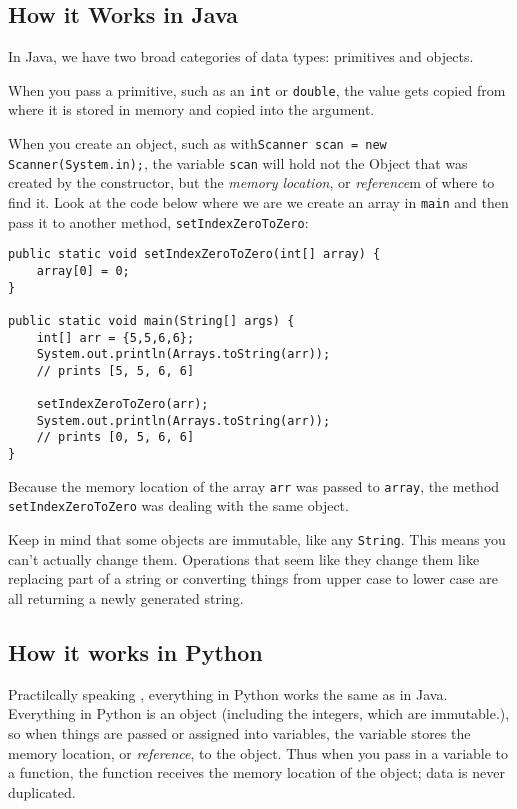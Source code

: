 \subsection{How it Works in Java}
In Java, we have two broad categories of data types: primitives and objects.

When you pass a primitive, such as an \texttt{int} or \texttt{double}, the value gets copied from where it is stored in memory and copied into the argument.

When you create an object, such as with\texttt{Scanner scan =  new Scanner(System.in);}, 
the variable \texttt{scan} will hold not the Object that was created by the constructor, but the \textit{memory location}, or  \textit{reference}m of where to find it.
Look at the code below where we are we create an array in \texttt{main} and then pass it to another method, \texttt{setIndexZeroToZero}:

\begin{verbatim}
public static void setIndexZeroToZero(int[] array) {
	array[0] = 0;
}

public static void main(String[] args) {
	int[] arr = {5,5,6,6};
	System.out.println(Arrays.toString(arr));
	// prints [5, 5, 6, 6]
	
	setIndexZeroToZero(arr);
	System.out.println(Arrays.toString(arr));
	// prints [0, 5, 6, 6]
}

\end{verbatim}

Because the memory location of the array \texttt{arr} was passed to \texttt{array}, the method \texttt{setIndexZeroToZero} was dealing with the same object. 


Keep in mind that some objects are immutable, like any \texttt{String}.  This means you can't actually change them.  Operations that seem like they change them like replacing part of a string or converting things from upper case to lower case are all returning a newly generated string.
\subsection{How it works in Python}

Practilcally  speaking , everything in Python works the same as in Java.
Everything in Python is an object (including the integers, which are immutable.), so when things are passed or assigned into variables, the variable stores the memory location, or \textit{reference}, to the object.  
Thus when you pass in a variable to a function, the function receives the memory location of the object; data is never duplicated.